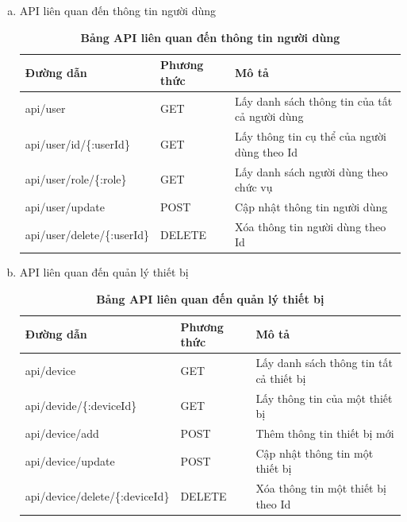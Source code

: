 \begin{enumerate}[a)]
  \item API liên quan đến thông tin người dùng
  

  \begin{table}[H]
    \centering
    \caption{\bfseries \fontsize{12pt}{0pt}\selectfont Bảng API liên quan đến thông tin người dùng}
    \begin{tabularx}{0.9\textwidth}{
    | >{\raggedright\arraybackslash}X
    | >{\raggedright\arraybackslash}m{2cm}
    | >{\raggedright\arraybackslash}X|
    }
    \hline
    \bfseries Đường dẫn    &\bfseries Phương thức    &\bfseries Mô tả\\ \hline
   api/user   &   GET  &  Lấy danh sách thông tin của tất cả người dùng \\  \hline
   api/user/id/\{:userId\}  &   GET     & Lấy thông tin cụ thể của người dùng theo Id \\ \hline
   api/user/role/\{:role\}  &   GET     & Lấy danh sách người dùng theo chức vụ \\ \hline
   api/user/update   &    POST    &  Cập nhật thông tin người dùng \\  \hline
   api/user/delete/\{:userId\}  &   DELETE     & Xóa thông tin người dùng theo Id \\ \hline

    \end{tabularx}
    \label{table_api_user}
\end{table}

\item API liên quan đến quản lý thiết bị


\begin{table}[H]
  \centering
  \caption{\bfseries \fontsize{12pt}{0pt}\selectfont Bảng API liên quan đến quản lý thiết bị}
  \begin{tabularx}{0.9\textwidth}{
  | >{\raggedright\arraybackslash}X
  | >{\raggedright\arraybackslash}m{2cm}
  | >{\raggedright\arraybackslash}X|
  }
  \hline
  \bfseries Đường dẫn    &\bfseries Phương thức    &\bfseries Mô tả\\ \hline
 api/device   &   GET  & Lấy danh sách thông tin tất cả thiết bị \\ \hline
 api/devide/\{:deviceId\}   &    GET    & Lấy thông tin của một thiết bị \\ \hline
 api/device/add &   POST     & Thêm thông tin thiết bị mới \\ \hline
 api/device/update  &     POST   & Cập nhật thông tin một thiết bị \\ \hline
 api/device/delete/\{:deviceId\}  &     DELETE   & Xóa thông tin một thiết bị theo Id \\ \hline


\end{tabularx}
\end{table}
\end{enumerate}
